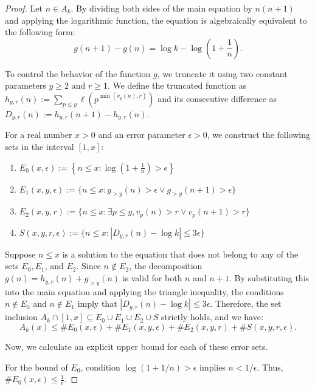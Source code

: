 \documentclass[12pt, a4paper]{article}
\theoremstyle{plain}
\theoremstyle{definition}
\begin{document}
\begin{proof}
Let $n \in A_k$. By dividing both sides of the main equation by $n(n + 1)$ and applying the logarithmic function, the equation is algebraically equivalent to the following form:
\[ g(n + 1) - g(n) = \log k - \log \left(1 + \frac{1}{n}\right). \]

To control the behavior of the function $g$, we truncate it using two constant parameters $y \geq 2$ and $r \geq 1$. We define the truncated function as $h_{y,r}(n) := \sum_{p \leq y} \ell\left(p^{\min{(v_p(n), r)}}\right)$ and its consecutive difference as $D_{y,r}(n) := h_{y,r}(n + 1) - h_{y,r}(n)$.

For a real number $x > 0$ and an error parameter $\epsilon > 0$, we construct the following sets in the interval $[1, x]$:
\begin{enumerate}
    \item $E_0(x, \epsilon) := \left\{n \leq x : \log \left(1 + \frac{1}{n}\right) > \epsilon \right\}$
    \item $E_1(x, y, \epsilon) := \{n \leq x : g_{>y}(n) > \epsilon \lor g_{>y}(n + 1) > \epsilon\}$
    \item $E_2(x, y, r) := \{n \leq x : \exists p \leq y, v_p(n) > r \lor v_p(n + 1) > r\}$
    \item $S(x, y, r, \epsilon) := \{n \leq x : |D_{y,r}(n) - \log k| \leq 3\epsilon\}$
\end{enumerate}

Suppose $n \leq x$ is a solution to the equation that does not belong to any of the sets $E_0, E_1$, and $E_2$. Since $n \notin E_2$, the decomposition $g(n) = h_{y,r}(n) + g_{>y}(n)$ is valid for both $n$ and $n + 1$. By substituting this into the main equation and applying the triangle inequality, the conditions $n \notin E_0$ and $n \notin E_1$ imply that $|D_{y,r}(n) - \log k| \leq 3\epsilon$. Therefore, the set inclusion $A_k \cap [1, x] \subseteq E_0 \cup E_1 \cup E_2 \cup S$ strictly holds, and we have:
\begin{equation}
A_k(x) \leq \text{\#}E_0(x, \epsilon) + \text{\#}E_1(x, y, \epsilon) + \text{\#}E_2(x, y, r) + \text{\#}S(x, y, r, \epsilon). \label{eq:1}
\end{equation}

Now, we calculate an explicit upper bound for each of these error sets.

For the bound of $E_0$, condition $\log \left(1 + 1/n\right) > \epsilon$ implies $n < 1/\epsilon$. Thus, $\text{\#}E_0(x, \epsilon) \leq \frac{1}{\epsilon}$.


\end{proof}
\end{document}
